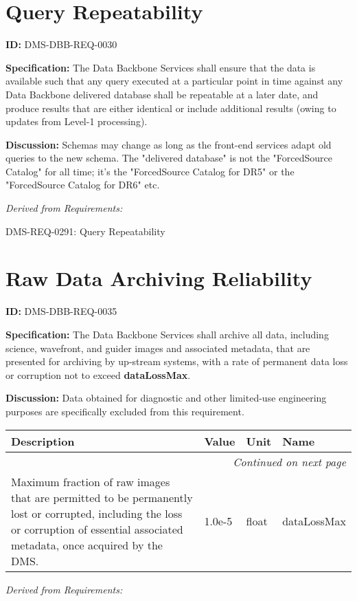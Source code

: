 \documentclass[SE,toc,lsstdraft]{lsstdoc}
\makeatletter
\newcommand{\paramname}[1]{\hspace{0pt}#1}
\newcommand{\unitname}[1]{\hspace{0pt}#1}
\newenvironment{parameters}[0]{%
\setlength\LTleft{0pt}
\setlength\LTright{\fill}
\begin{small}
\begin{longtable}[]{|p{0.49\textwidth}|l|p{0.6in}|p{1.70in}@{}|}

\hline \textbf{Description} & \textbf{Value} & \textbf{Unit} & \textbf{Name} \\ \hline
\endhead

\hline \multicolumn{4}{r}{\emph{Continued on next page}} \\
\endfoot

\hline\hline
\endlastfoot
}{%
\hline
\end{longtable}
\end{small}
}
\makeatother
\begin{document}
\section{Query Repeatability}

\label{DMS-DBB-REQ-0030}
\textbf{ID:} DMS-DBB-REQ-0030

\textbf{Specification:}
The Data Backbone Services shall ensure that the data is available such that any query executed at a particular point in time against any Data Backbone delivered database shall be repeatable at a later date, and produce results that are either identical or include additional results (owing to updates from Level-1 processing).

\textbf{Discussion:}
Schemas may change as long as the front-end services adapt old queries to the new schema.   The "delivered database" is not the "ForcedSource Catalog" for all time; it's the "ForcedSource Catalog for DR5" or the "ForcedSource Catalog for DR6" etc.

\emph{Derived from Requirements:}

DMS-REQ-0291:
Query Repeatability \newline

\section{Raw Data Archiving Reliability}

\label{DMS-DBB-REQ-0035}
\textbf{ID:} DMS-DBB-REQ-0035

\textbf{Specification:}
The Data Backbone Services shall archive all data, including science, wavefront, and guider images and associated metadata, that are presented for archiving by up-stream systems, with a rate of permanent data loss or corruption not to exceed \textbf{dataLossMax}.

\textbf{Discussion:}
Data obtained for diagnostic and other limited-use engineering purposes are specifically excluded from this requirement.

\begin{parameters}
Maximum fraction of raw images that are permitted to be permanently lost or corrupted, including the loss or corruption of essential associated metadata, once acquired by the DMS.
&
1.0e-5
&
\unitname{%
float
}
&
\paramname{%
dataLossMax
} \\\hline
\end{parameters}

\emph{Derived from Requirements:}
\end{document}
